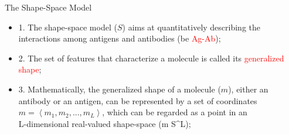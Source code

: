 \begin{frame}{The Shape-Space Model}
\begin{itemize}
\item{1. The shape-space model (\begin{math} S\end{math}) aims at quantitatively describing the interactions among antigens and antibodies (be \textcolor{red}{Ag-Ab});}
\item{2. The set of features that characterize a molecule is called its \textcolor{red}{generalized shape};}
\item{
3. Mathematically, the generalized shape of a molecule (\begin{math} m\end{math}), either an antibody or an antigen, can be represented by a set of coordinates \begin{math} m =\left \langle m_1, m_2,..., m_L\right\rangle\end{math}, which can be regarded as a point in an \\
L-dimensional real-valued shape-space (m \in S^L);
}
\end{itemize}
\end{frame}



